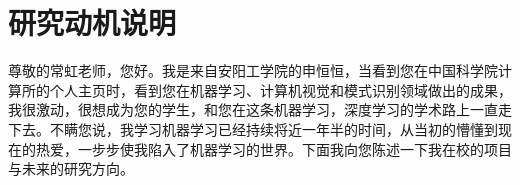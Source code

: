 \documentclass[UTF8,a4paper]{ctexart}
\begin{document}

\titleformat{\section}{\centering\Large\bfseries}{\S\,\thesection}{1em}{}


\section*{研究动机说明}
尊敬的常虹老师，您好。我是来自安阳工学院的申恒恒，当看到您在中国科学院计算所的个人主页时，看到您在机器学习、计算机视觉和模式识别领域做出的成果，我很激动，很想成为您的学生，和您在这条机器学习，深度学习的学术路上一直走下去。不瞒您说，我学习机器学习已经持续将近一年半的时间，从当初的懵懂到现在的热爱，一步步使我陷入了机器学习的世界。下面我向您陈述一下我在校的项目与未来的研究方向。\\
\end{document}
